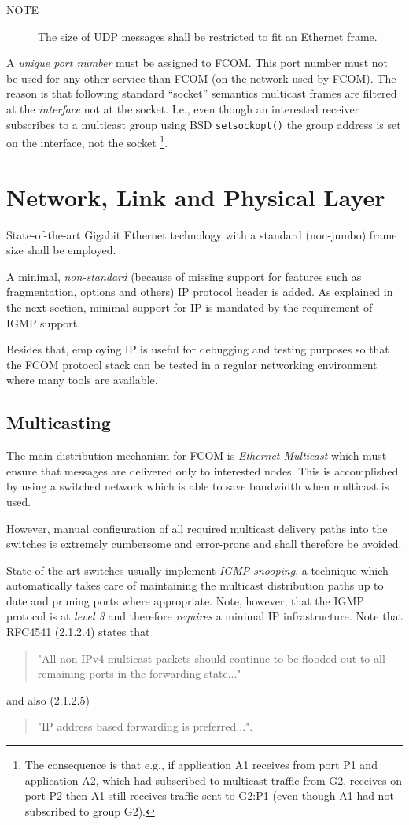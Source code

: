 \documentclass[11pt]{article}
\newcommand{\fcom}{FCOM}
\newcommand{\note}[1]{
	\begin{description}
		\item[NOTE] #1
	\end{description}
}
\begin{document}
\note{The size of UDP messages shall be restricted to
fit an Ethernet frame.}

A {\em unique port number} must be assigned to \fcom{}. This port
number must not be used for any other service than \fcom{}
(on the network used by \fcom{}).
The reason is that following standard ``socket'' semantics
multicast frames are filtered at the {\em interface} not at the
socket. I.e., even though an interested receiver subscribes
to a multicast group using BSD {\tt setsockopt()} the
group address is set on the interface, not the socket%
\footnote{
The consequence is that e.g., if application A1 receives
from port P1 and application A2, which
had subscribed to multicast traffic from G2, receives on
port P2 then A1 still receives traffic sent to G2:P1
(even though A1 had not subscribed to group G2).
}.

\section{Network, Link and Physical Layer}
State-of-the-art Gigabit Ethernet technology with a
standard (non-jumbo) frame size shall be employed.

A minimal, {\em non-standard} (because of missing support for
features such as fragmentation, options and others) IP protocol
header is added. As explained in the next section, minimal support
for IP is mandated by the requirement of IGMP support.

Besides that, employing IP is useful
for debugging and testing purposes so that the \fcom{}
protocol stack can be tested in a regular networking environment
where many tools are available.

\subsection{Multicasting}
The main distribution mechanism for \fcom{} is {\em Ethernet Multicast}
which must ensure that messages are delivered only to interested
nodes. This is accomplished by using a switched network which
is able to save bandwidth when multicast is used.

However,
manual configuration of all required multicast delivery
paths into the switches is extremely cumbersome and error-prone
and shall therefore be avoided.

State-of-the art switches usually implement {\em IGMP snooping},
a technique
which automatically takes care of maintaining the multicast
distribution paths up to date and pruning ports where appropriate.
Note, however, that the IGMP
protocol is at {\em level 3} and therefore {\em requires}
a minimal IP infrastructure. Note that RFC4541 (2.1.2.4) states
that
\begin{quotation}
\noindent
"All non-IPv4 multicast packets should continue to be
flooded out to all remaining ports in the forwarding state..."
\end{quotation}
and also (2.1.2.5)
\begin{quotation}
\noindent
"IP address based forwarding is preferred...".
\end{quotation}
\end{document}
